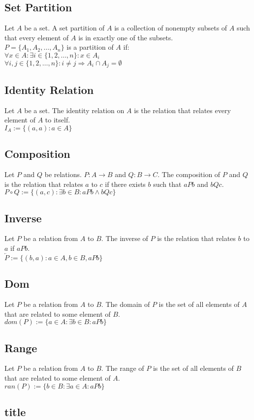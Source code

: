 \documentclass{article}
\begin{document}
\subsection*{Set Partition}
Let $A$ be a set. A set partition of $A$ is a collection of nonempty subsets of $A$ such that every element of $A$ is in exactly one of the subsets.\\
$P = \{A_1, A_2, \ldots, A_n\}$ is a partition of $A$ if:\\
$\forall x \in A: \exists i \in \{1,2,\ldots,n\} : x \in A_i$\\
$\forall i,j \in \{1,2,\ldots,n\} : i \neq j \Rightarrow A_i \cap A_j = \emptyset$\\

\subsection*{Identity Relation}
Let $A$ be a set. The identity relation on $A$ is the relation that relates every element of $A$ to itself.\\
$I_A := \{(a,a): a \in A\}$
\subsection*{Composition}
Let $P$ and $Q$ be relations. $P:A \rightarrow B$ and $Q:B \rightarrow C$. The composition of $P$ and $Q$ is the relation that relates $a$ to $c$ if there exists $b$ such that $aPb$ and $bQc$.\\
$P \circ Q := \{(a,c): \exists b \in B: aPb \land bQc\}$

\subsection*{Inverse}
Let $P$ be a relation from $A$ to $B$. The inverse of $P$ is the relation that relates $b$ to $a$ if $aPb$.\\
$\overleftarrow{P} := \{(b,a): a\in A, b\in B, aPb\}$

\subsection*{Dom}
Let $P$ be a relation from $A$ to $B$. The domain of $P$ is the set of all elements of $A$ that are related to some element of $B$.\\
$dom(P) := \{a \in A: \exists b \in B: aPb\}$

\subsection*{Range}
Let $P$ be a relation from $A$ to $B$. The range of $P$ is the set of all elements of $B$ that are related to some element of $A$.\\
$ran(P) := \{b \in B: \exists a \in A: aPb\}$

\subsection*{title}
\end{document}
